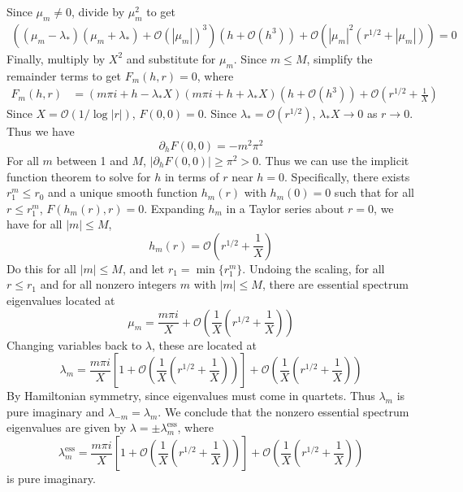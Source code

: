 \documentclass[thesis.tex]{subfiles}
\begin{document}
Since $\mu_m \neq 0$, divide by $\mu_m^2$ to get
\begin{equation}\label{Bess3}
\begin{aligned}
\left((\mu_m - \lambda_*)(\mu_m + \lambda_*) + \mathcal{O}( |\mu_m|)^3 \right) \left( h + \mathcal{O}(h^3) \right) + \mathcal{O}\left( |\mu_m|^2(r^{1/2} + |\mu_m|) \right) = 0
\end{aligned}
\end{equation}
Finally, multiply by $X^2$ and substitute for $\mu_m$. Since $m \leq M$, simplify the remainder terms to get $F_m(h, r) = 0$, where
\begin{equation}\label{Bess4}
\begin{aligned}
F_m(h, r) &= (m \pi i + h - \lambda_* X)(m \pi i + h + \lambda_* X) \left( h + \mathcal{O}(h^3) \right) + \mathcal{O}\left( r^{1/2} + \frac{1}{X} \right)
\end{aligned}
\end{equation}
Since $X = \mathcal{O}(1/\log|r|)$, $F(0,0) = 0$. Since $\lambda_* = \mathcal{O}(r^{1/2})$, $\lambda_* X \rightarrow 0$ as $r \rightarrow 0$. Thus we have
\[
\partial_h F(0,0) = -m^2 \pi^2
\]
For all $m$ between 1 and $M$, $|\partial_h F(0,0)| \geq \pi^2 > 0$. Thus we can use the implicit function theorem to solve for $h$ in terms of $r$ near $h = 0$. Specifically, there exists $r_1^m \leq r_0$ and a unique smooth function $h_m(r)$ with $h_m(0) = 0$ such that for all $r \leq r_1^m$, $F(h_m(r),r) = 0$. Expanding $h_m$ in a Taylor series about $r = 0$, we have for all $|m| \leq M$,
\[
h_m(r) = \mathcal{O}\left( r^{1/2} + \frac{1}{X} \right)
\]
Do this for all $|m| \leq M$, and let $r_1 = \min\{ r_1^m \}$. Undoing the scaling, for all $r \leq r_1$ and for all nonzero integers $m$ with $|m| \leq M$, there are essential spectrum eigenvalues located at
\[
\mu_m = \frac{m \pi i}{X} + \mathcal{O}\left( \frac{1}{X}\left( r^{1/2} + \frac{1}{X} \right) \right)
\]
Changing variables back to $\lambda$, these are located at
\[
\lambda_m = \frac{m \pi i}{X}\left[1 + \mathcal{O}\left( \frac{1}{X}\left( r^{1/2} + \frac{1}{X} \right) \right) \right] + \mathcal{O}\left( \frac{1}{X}\left( r^{1/2} + \frac{1}{X} \right) \right)
\]
By Hamiltonian symmetry, since eigenvalues must come in quartets. Thus $\lambda_m$ is pure imaginary and $\lambda_{-m} = \lambda_m$. We conclude that the nonzero essential spectrum eigenvalues are given by $\lambda = \pm \lambda_m^{\text{ess}}$, where
\[
\lambda_m^{\text{ess}} = \frac{m \pi i}{X}\left[1 + \mathcal{O}\left( \frac{1}{X}\left( r^{1/2} + \frac{1}{X} \right) \right) \right] + \mathcal{O}\left( \frac{1}{X}\left( r^{1/2} + \frac{1}{X} \right) \right)
\]
is pure imaginary.
\end{document}
